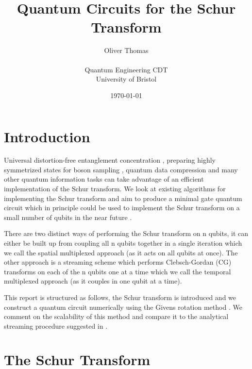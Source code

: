 \documentclass[12pt]{article}
\begin{document}

    \title{Quantum Circuits for the Schur Transform}
    \author{Oliver Thomas \\[0.5em] \\ Quantum Engineering CDT \\ University of Bristol}
    \date{\today}
    \maketitle


\section{Introduction}

Universal distortion-free entanglement concentration \cite{blume2014streaming}, preparing highly symmetrized states for boson sampling  \cite{moylett2018quantum}, quantum data compression \cite{plesch2010efficient} and many other quantum information tasks \cite{harrow2005applications} can take advantage of an efficient implementation of the Schur transform. We look at existing algorithms for implementing the Schur transform and aim to produce a minimal gate quantum circuit which in principle could be used to implement the Schur transform on a small number of qubits in the near future \cite{kirby2017practical}.

There are two distinct ways of performing the Schur transform on n qubits, it can either be built up from coupling all n qubits together in a single iteration which we call the spatial multiplexed approach (as it acts on all qubits at once). The other approach is a streaming scheme which performs Clebsch-Gordan (CG) transforms on each of the n qubits one at a time which we call the temporal multiplexed approach (as it couples in one qubit at a time).  

This report is structured as follows, the Schur transform is introduced and we construct a quantum circuit numerically using the Givens rotation method \cite{li2013decomposition}. We comment on the scalability of this method and compare it to the analytical streaming procedure suggested in \cite{bacon2006efficient}. 

\section{The Schur Transform}
\end{document}
